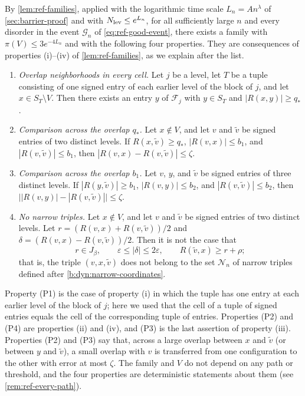 By \cref{lem:ref-families}, applied with the logarithmic time scale $L_n=An^\lambda$ of \cref{sec:barrier-proof} and with $N_{\rm lev}\le e^{L_n}$, for all sufficiently large $n$ and every disorder in the event $\mathcal G_n$ of \eqref{eq:ref-good-event}, there exists a family with $\pi(V)\le3e^{-4L_n}$ and with the following four properties. They are consequences of properties (i)--(iv) of \cref{lem:ref-families}, as we explain after the list.
\begin{enumerate}[label=(P\arabic*)]
\item \emph{Overlap neighborhoods in every cell.} Let $j$ be a level, let $T$ be a tuple consisting of one signed entry of each earlier level of the block of $j$, and let $x\in S_T\setminus V$. Then there exists an entry $y$ of $\mathcal F_j$ with $y\in S_T$ and $|R(x,y)|\ge q_*$.
\item \emph{Comparison across the overlap $q_*$.} Let $x\notin V$, and let $v$ and ${\widetilde v}$ be signed entries of two distinct levels. If $R(x,{\widetilde v})\ge q_*$, $|R(v,x)|\le b_1$, and $|R(v,{\widetilde v})|\le b_1$, then $|R(v,x)-R(v,{\widetilde v})|\le\zeta$.
\item \emph{Comparison across the overlap $b_1$.} Let $v$, $y$, and ${\widetilde v}$ be signed entries of three distinct levels. If $|R(y,{\widetilde v})|\ge b_1$, $|R(v,y)|\le b_2$, and $|R(v,{\widetilde v})|\le b_2$, then $\bigl||R(v,y)|-|R(v,{\widetilde v})|\bigr|\le\zeta$.
\item \emph{No narrow triples.} Let $x\notin V$, and let $v$ and ${\widetilde v}$ be signed entries of two distinct levels. Let $r=(R(v,x)+R(v,{\widetilde v}))/2$ and $\delta=(R(v,x)-R(v,{\widetilde v}))/2$. Then it is not the case that
\[
 r\in J_\beta,\qquad \varepsilon\le|\delta|\le2\varepsilon,\qquad R({\widetilde v},x)\ge r+\rho;
\]
that is, the triple $(v,x,{\widetilde v})$ does not belong to the set $\mathcal N_n$ of narrow triples defined after \eqref{b:dyn:narrow-coordinates}.
\end{enumerate}
Property (P1) is the case of property (i) in which the tuple has one entry at each earlier level of the block of $j$; here we used that the cell of a tuple of signed entries equals the cell of the corresponding tuple of entries. Properties (P2) and (P4) are properties (ii) and (iv), and (P3) is the last assertion of property (iii). Properties (P2) and (P3) say that, across a large overlap between $x$ and ${\widetilde v}$ (or between $y$ and ${\widetilde v}$), a small overlap with $v$ is transferred from one configuration to the other with error at most $\zeta$. The family and $V$ do not depend on any path or threshold, and the four properties are deterministic statements about them (see \cref{rem:ref-every-path}).

